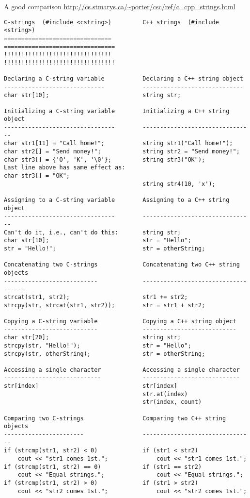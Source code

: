A good comparison \url{http://cs.stmarys.ca/~porter/csc/ref/c_cpp_strings.html}
\begin{verbatim}
C-strings  (#include <cstring>)         C++ strings  (#include <string>)
===============================         ================================
!!!!!!!!!!!!!!!!!!!!!!!!!!!!!!!         !!!!!!!!!!!!!!!!!!!!!!!!!!!!!!!!

Declaring a C-string variable           Declaring a C++ string object
-----------------------------           -----------------------------
char str[10];                           string str;

Initializing a C-string variable        Initializing a C++ string object
--------------------------------        --------------------------------
char str1[11] = "Call home!";           string str1("Call home!");
char str2[] = "Send money!";            string str2 = "Send money!";
char str3[] = {'O', 'K', '\0'};         string str3("OK");
Last line above has same effect as:
char str3[] = "OK";
                                        string str4(10, 'x');
                                        
Assigning to a C-string variable        Assigning to a C++ string object
--------------------------------        --------------------------------
Can't do it, i.e., can't do this:       string str;
char str[10];                           str = "Hello";
str = "Hello!";                         str = otherString;

Concatenating two C-strings             Concatenating two C++ string objects
---------------------------             ------------------------------------
strcat(str1, str2);                     str1 += str2;
strcpy(str, strcat(str1, str2));        str = str1 + str2;

Copying a C-string variable             Copying a C++ string object
---------------------------             ---------------------------
char str[20];                           string str;
strcpy(str, "Hello!");                  str = "Hello";
strcpy(str, otherString);               str = otherString;

Accessing a single character            Accessing a single character
----------------------------            ----------------------------
str[index]                              str[index]
                                        str.at(index)
                                        str(index, count)
                                        
Comparing two C-strings                 Comparing two C++ string objects
-----------------------                 --------------------------------
if (strcmp(str1, str2) < 0)             if (str1 < str2)
    cout << "str1 comes 1st.";              cout << "str1 comes 1st.";
if (strcmp(str1, str2) == 0)            if (str1 == str2)
    cout << "Equal strings.";               cout << "Equal strings.";
if (strcmp(str1, str2) > 0)             if (str1 > str2)
    cout << "str2 comes 1st.";              cout << "str2 comes 1st.";
    

\end{verbatim}
